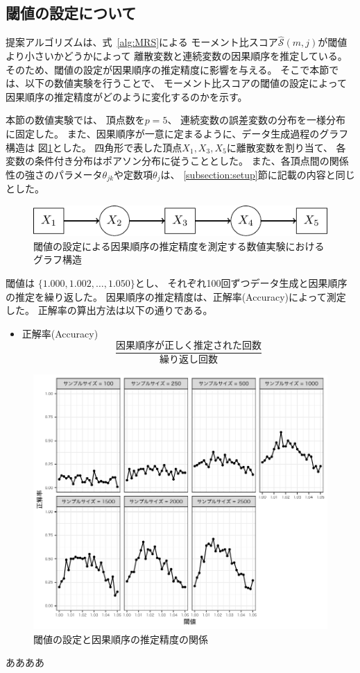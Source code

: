 
\subsection{閾値の設定について}

提案アルゴリズムは、式~\eqref{alg:MRS}による
モーメント比スコア$\widehat{\mathcal S}(m,j)$が閾値より小さいかどうかによって
離散変数と連続変数の因果順序を推定している。
そのため、閾値の設定が因果順序の推定精度に影響を与える。
そこで本節では、以下の数値実験を行うことで、
モーメント比スコアの閾値の設定によって因果順序の推定精度がどのように変化するのかを示す。

本節の数値実験では、
頂点数を$p = 5$、
連続変数の誤差変数の分布を一様分布に固定した。
また、因果順序が一意に定まるように、データ生成過程のグラフ構造は
図\ref{fig:threshold}とした。
四角形で表した頂点$X_1,X_3,X_5$に離散変数を割り当て、
各変数の条件付き分布はポアソン分布に従うこととした。
また、各頂点間の関係性の強さのパラメータ$\theta_{jk}$や定数項$\theta_j$は、
\ref{subsection:setup}節に記載の内容と同じとした。

\begin{figure}[ht]
  \centering
  \includegraphics{./picture/threshold.pdf}
  \caption{閾値の設定による因果順序の推定精度を測定する数値実験におけるグラフ構造}
  \label{fig:threshold}
\end{figure}

閾値は $ \{ 1.000, 1.002, \dots, 1.050 \}$とし、
それぞれ100回ずつデータ生成と因果順序の推定を繰り返した。
因果順序の推定精度は、正解率(Accuracy)によって測定した。
正解率の算出方法は以下の通りである。
\begin{itemize}
  \item 正解率(Accuracy)
  \begin{equation*}
    \frac{\text{因果順序が正しく推定された回数}}{\text{繰り返し回数}}
  \end{equation*}
\end{itemize}

\begin{figure}
  \includegraphics[width=13cm, bb=9 9 358 434]{./picture/plot_threshold.pdf}
  \caption{閾値の設定と因果順序の推定精度の関係}
  \label{fig:plot_threshold}
\end{figure}

ああああ

